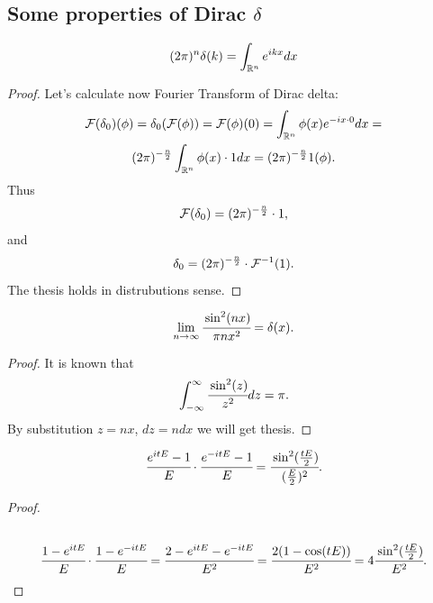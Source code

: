\documentclass[main.tex]{subfiles}
\begin{document}
\subsection{Some properties of Dirac $\delta$}
\begin{fact}
\begin{equation}
\\
(2\pi)^{n}\delta(k) = \int_{\mathbb{R}^n} e^{ikx}dx\\
\end{equation}
\end{fact}
\begin{proof}
Let's calculate now Fourier Transform of Dirac delta:
\begin{multline}
\mathcal{F}(\delta_0)(\phi) = \delta_0 (\mathcal{F}(\phi)) = \mathcal{F}(\phi)(0) =  \int_{\mathbb{R}^n} \phi(x) e^{-ix\cdot 0}dx = \\
(2\pi)^{-\frac{n}{2}} \int_{\mathbb{R}^n} \phi(x) \cdot 1 dx =  (2\pi)^{-\frac{n}{2}} 1(\phi).
\\
\end{multline}
Thus
\begin{equation}
\mathcal{F}(\delta_0) = (2\pi)^{-\frac{n}{2}} \cdot 1,
\end{equation}
and 
\begin{equation}
\delta_0 = (2\pi)^{-\frac{n}{2}} \cdot \mathcal{F}^{-1}(1).
\end{equation}
The thesis holds in distrubutions sense.
\end{proof}
\begin{fact}
\begin{equation}
\label{sin2-delta}
\lim_{n\to \infty} \cfrac{\sin^2(nx)}{\pi nx^2} = \delta(x).
\end{equation}
\end{fact}
\begin{proof}
It is known that
\begin{equation}
\int_{-\infty}^{\infty}\cfrac{\sin^2(z)}{z^2}dz = \pi.
\end{equation}
By substitution $z = nx$, $dz = ndx$ we will get thesis.
\end{proof}

\begin{lemma}
\begin{equation}
\cfrac{e^{itE} - 1}{E}\cdot \cfrac{e^{-itE} - 1}{E} = \cfrac{\sin^2(\frac{tE}{2})}{(\frac{E}{2})^2}.
\end{equation}
\end{lemma}
\begin{proof}
\begin{multline*}\\
\cfrac{1 - e^{itE}}{E}\cdot \cfrac{1 - e^{-itE}}{E} = \cfrac{2 - e^{itE} - e^{-itE}}{E^2}
= \cfrac{2(1 - \cos(tE))}{E^2} = 4 \cfrac{\sin^2(\frac{tE}{2})}{E^2}.
\end{multline*}
\end{proof}
\end{document}

